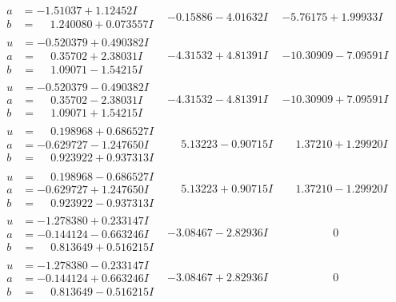 \documentclass[1p]{elsarticle_modified}
\theoremstyle{definition}
\begin{document}
$$\begin{array}{c|c|c}
\begin{aligned}
a &= -1.51037 + 1.12452 I \\
b &= \phantom{-}1.240080 + 0.073557 I\end{aligned}
 & -0.15886 - 4.01632 I & -5.76175 + 1.99933 I \\ \hline\begin{aligned}
u &= -0.520379 + 0.490382 I \\
a &= \phantom{-}0.35702 + 2.38031 I \\
b &= \phantom{-}1.09071 - 1.54215 I\end{aligned}
 & -4.31532 + 4.81391 I & -10.30909 - 7.09591 I \\ \hline\begin{aligned}
u &= -0.520379 - 0.490382 I \\
a &= \phantom{-}0.35702 - 2.38031 I \\
b &= \phantom{-}1.09071 + 1.54215 I\end{aligned}
 & -4.31532 - 4.81391 I & -10.30909 + 7.09591 I \\ \hline\begin{aligned}
u &= \phantom{-}0.198968 + 0.686527 I \\
a &= -0.629727 - 1.247650 I \\
b &= \phantom{-}0.923922 + 0.937313 I\end{aligned}
 & \phantom{-}5.13223 - 0.90715 I & \phantom{-}1.37210 + 1.29920 I \\ \hline\begin{aligned}
u &= \phantom{-}0.198968 - 0.686527 I \\
a &= -0.629727 + 1.247650 I \\
b &= \phantom{-}0.923922 - 0.937313 I\end{aligned}
 & \phantom{-}5.13223 + 0.90715 I & \phantom{-}1.37210 - 1.29920 I \\ \hline\begin{aligned}
u &= -1.278380 + 0.233147 I \\
a &= -0.144124 - 0.663246 I \\
b &= \phantom{-}0.813649 + 0.516215 I\end{aligned}
 & -3.08467 - 2.82936 I & \phantom{-0.000000 } 0 \\ \hline\begin{aligned}
u &= -1.278380 - 0.233147 I \\
a &= -0.144124 + 0.663246 I \\
b &= \phantom{-}0.813649 - 0.516215 I\end{aligned}
 & -3.08467 + 2.82936 I & \phantom{-0.000000 } 0 \\ \hline\begin{aligned}

\end{aligned}
\end{array}$$
\end{document}
